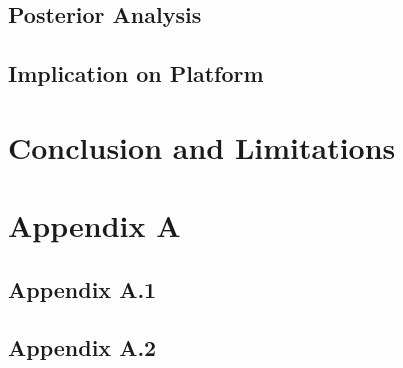\documentclass[a4paper, 12pt]{article}
\begin{document}
\subsection{Posterior Analysis}
\subsection{Implication on Platform}
\section{Conclusion and Limitations}
\clearpage


\clearpage
\section*{Appendix A}
\subsection*{Appendix A.1}
\subsection*{Appendix A.2}
\end{document}
